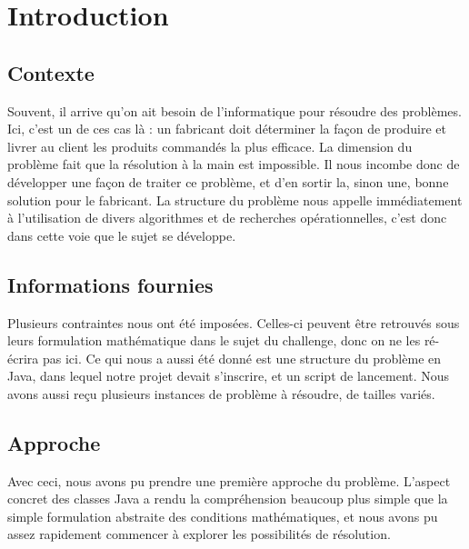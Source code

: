 \section{Introduction}
\subsection{Contexte}
Souvent, il arrive qu'on ait besoin de l'informatique pour résoudre des problèmes. Ici, c'est un de ces cas là : un fabricant doit déterminer la façon de produire et livrer au client les produits commandés la plus efficace. La dimension du problème fait que la résolution à la main est impossible. Il nous incombe donc de développer une façon de traiter ce problème, et d'en sortir la, sinon une, bonne solution pour le fabricant. La structure du problème nous appelle immédiatement à l'utilisation de divers algorithmes et de recherches opérationnelles, c'est donc dans cette voie que le sujet se développe. 

\subsection{Informations fournies}
Plusieurs contraintes nous ont été imposées. Celles-ci peuvent être retrouvés sous leurs formulation mathématique dans le sujet du challenge, donc on ne les ré-écrira pas ici. Ce qui nous a aussi été donné  est une structure du problème en Java, dans lequel notre projet devait s'inscrire, et un script de lancement.
Nous avons aussi reçu plusieurs instances de problème à résoudre, de tailles variés.

\subsection{Approche}
Avec ceci, nous avons pu prendre une première approche du problème. L'aspect concret des classes Java a rendu la compréhension beaucoup plus simple que la simple formulation abstraite des conditions mathématiques, et nous avons pu assez rapidement commencer à explorer les possibilités de résolution.